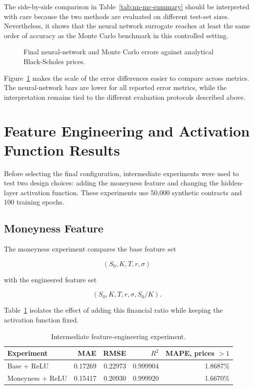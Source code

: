 The side-by-side comparison in Table~\ref{tab:nn-mc-summary} should be interpreted with care because the two methods are evaluated on different test-set sizes.
Nevertheless, it shows that the neural network surrogate reaches at least the same order of accuracy as the Monte Carlo benchmark in this controlled setting.

\begin{figure}[H]
    \centering
    \caption{Final neural-network and Monte Carlo errors against analytical Black-Scholes prices.}
    \label{fig:nn-vs-mc-metrics}
\end{figure}

Figure~\ref{fig:nn-vs-mc-metrics} makes the scale of the error differences easier to compare across metrics.
The neural-network bars are lower for all reported error metrics, while the interpretation remains tied to the different evaluation protocols described above.

\section{Feature Engineering and Activation Function Results}

Before selecting the final configuration, intermediate experiments were used to test two design choices:
adding the moneyness feature and changing the hidden-layer activation function.
These experiments use 50,000 synthetic contracts and 100 training epochs.

\subsection{Moneyness Feature}

The moneyness experiment compares the base feature set

\begin{equation}
    (S_0, K, T, r, \sigma)
\end{equation}

with the engineered feature set

\begin{equation}
    (S_0, K, T, r, \sigma, S_0/K).
\end{equation}

Table~\ref{tab:moneyness-results} isolates the effect of adding this financial ratio while keeping the activation function fixed.

\begin{table}[H]
    \centering
    \begin{tabular}{lrrrr}
        \toprule
        Experiment & MAE & RMSE & $R^2$ & MAPE, prices $> 1$ \\
        \midrule
        Base + ReLU             & 0.17269 & 0.22973 & 0.999904 & 1.8687\% \\
        Moneyness + ReLU        & 0.15417 & 0.20930 & 0.999920 & 1.6670\% \\
        \bottomrule
    \end{tabular}
    \caption{Intermediate feature-engineering experiment.}
    \label{tab:moneyness-results}
\end{table}

